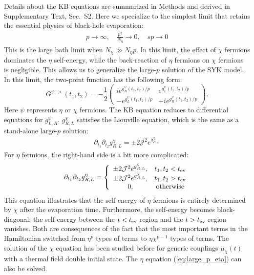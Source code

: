 \documentclass[pdflatex,sn-nature]{sn-jnl}
\begin{document}
Details about the KB equations are summarized in Methods and derived in Supplementary Text, Sec.~S2. Here we specialize to the simplest limit that retains the essential physics of black-hole evaporation:
\begin{align}
p\rightarrow \infty,\quad \frac{p^2}{N_\eta}\rightarrow 0,\quad sp\rightarrow 0
\end{align}
This is the large bath limit when $N_\chi \gg N_\eta p$. In this limit, the effect of $\chi$ fermions dominates the $\eta$ self-energy, while the back-reaction of $\eta$ fermions on $\chi$ fermions is negligible. This allows us to generalize the large-$p$ solution of the SYK model\cite{maldacena2016remarks}. In this limit, the two-point function has the following form:
\begin{displaymath}
	G^{\psi,>}(t_1,t_2)=-\frac{1}{2}
	\left(\begin{array}{cc}
	i e^{g^\psi_R(t_1,t_2)/p} & e^{g^\psi_L(t_1,t_2)/p}\\
	-e^{g^\psi_L(t_1,t_2)/p} & +i e^{g^\psi_R(t_1,t_2)/p}
	\end{array}\right).
\end{displaymath}
Here $\psi$ represents $\eta$ or $\chi$ fermions. The KB equation reduces to differential equations for $g^\psi_{L,R}$. $g^\chi_{R,L}$ satisfies the Liouville equation, which is the same as a stand-alone large-$p$ solution:
\begin{align}
	 \partial_{t_1}\partial_{t_2}g^\chi_{R,L}=\pm 2\mathcal{J}^2e^{g^\chi_{R,L}}\label{eq:large_p_chi}
\end{align}
For $\eta$ fermions, the right-hand side is a bit more complicated:
\begin{equation}
\partial_{t_1}\partial_{t_2}g^\eta_{R,L}=\left\{\begin{array}{cc}\pm2\mathcal{J}^2e^{g^\eta_{R,L}},&t_1,t_2<t_{\rm ev}\\\pm2\mathcal{J}^2e^{g^\chi_{R,L}},&t_1,t_2>t_{\rm ev}\\0,&\text{otherwise}\end{array}\right.\label{eq:large_p_eta}
\end{equation}
This equation illustrates that the self-energy of $\eta$ fermions is entirely determined by $\chi$ after the evaporation time. Furthermore, the self-energy becomes block-diagonal: the self-energy between the $t<t_{\rm ev}$ region and the $t>t_{\rm ev}$ region vanishes. Both are consequences of the fact that the most important terms in the Hamiltonian switched from $\eta^p$ types of terms to $\eta\chi^{p-1}$ types of terms. The solution of the $\chi$ equation has been studied before for generic couplings $\mu_\chi(t)$ with a thermal field double initial state\cite{lensky2021rescuing}. The $\eta$ equation (\ref{eq:large_p_eta}) can also be solved.
\end{document}
